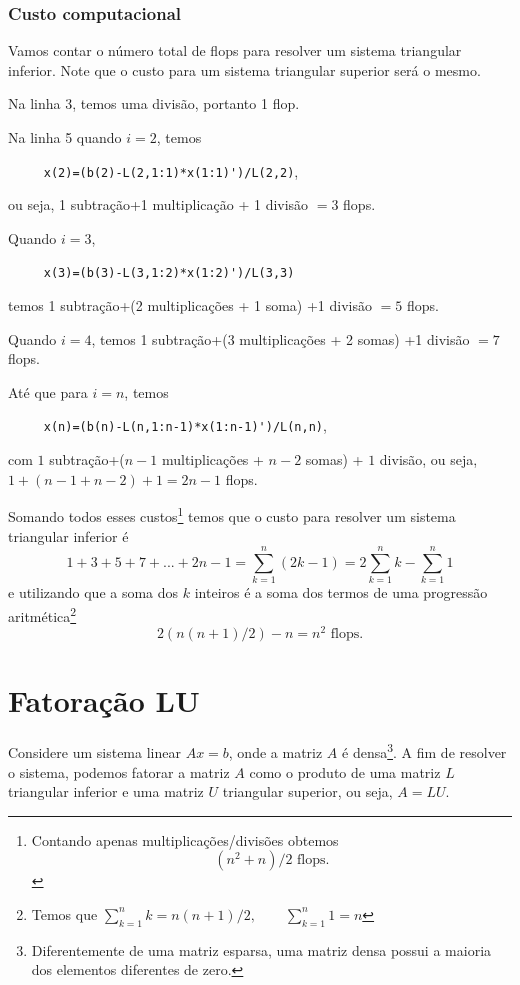 

\subsubsection{Custo computacional}
Vamos contar o número total de flops para resolver um sistema triangular inferior. Note que o custo para um sistema triangular superior será o mesmo.

Na linha 3, temos uma divisão, portanto 1 flop.

Na linha 5 quando $i=2$, temos

\verb#     x(2)=(b(2)-L(2,1:1)*x(1:1)')/L(2,2)#,

ou seja, 1 subtração+1 multiplicação + 1 divisão $=3$ flops.

Quando $i=3$,

\verb#     x(3)=(b(3)-L(3,1:2)*x(1:2)')/L(3,3)#

temos 1 subtração+(2 multiplicações + 1 soma) +1 divisão $=5$ flops.

Quando $i=4$, temos 1 subtração+(3 multiplicações + 2 somas) +1 divisão $=7$ flops.

Até que para $i=n$, temos

\verb#     x(n)=(b(n)-L(n,1:n-1)*x(1:n-1)')/L(n,n)#,

com $1$ subtração+($n-1$ multiplicações + $n-2$ somas) + $1$ divisão, ou seja, $1+(n-1+n-2)+1=2n-1$ flops.

Somando todos esses custos\footnote{Contando apenas multiplicações/divisões obtemos
	\begin{equation}
	(n^2+n)/2  \text{~flops}.
	\end{equation}} temos que o custo para resolver um sistema triangular inferior é
\begin{equation}
1 +3+5+7+...+2n-1=  \sum_{k=1}^n(2k-1) = 2 \sum_{k=1}^nk -\sum_{k=1}^n1
\end{equation}
e utilizando que a soma dos $k$ inteiros é a soma dos termos de uma progressão aritmética\footnote{Temos que $\displaystyle \sum_{k=1}^n k =n(n+1)/2, \quad\quad \sum_{k=1}^n 1=n$}
\begin{equation}
2 ( n(n+1)/2 ) -n=  n^2 \text{~flops}.
\end{equation}
\fi

\section{Fatoração LU}
Considere um sistema linear $Ax = b$, onde a matriz $A$ é densa\footnote{Diferentemente de uma matriz esparsa, uma matriz densa possui a maioria dos elementos diferentes de zero.}. A fim de resolver o sistema, podemos fatorar a matriz $A$ como o produto de uma matriz $L$ triangular inferior e uma matriz $U$ triangular superior, ou seja, $A=LU$.

